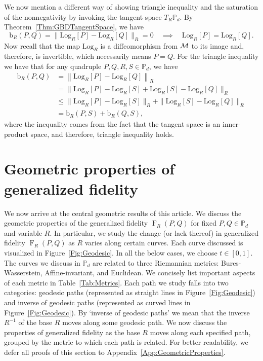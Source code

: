 \documentclass[12pt]{article}
\theoremstyle{definition}
\def \Log {\mathrm{Log}}
\begin{document}
We now mention a different way of showing triangle inequality and the saturation of the nonnegativity by invoking the tangent space $T_R \mathbb P_d$. By Theorem~\ref{Thm:GBDTangentSpace}, we have
\begin{equation}
    \text{b}_R(P,Q) = \| \Log_R[P] - \Log_R[Q]\|_R = 0 \quad \implies \quad  \Log_R[P] = \Log_R[Q].  
\end{equation}
Now recall that the map $\Log_R$ is a diffeomorphism from $\cal M$ to its image and, therefore, is invertible, which necessarily means $P = Q$. For the triangle inequality we have that for any quadruple $P,Q,R,S \in \mathbb P_d$, we have
\begin{equation}
\begin{aligned}
\text{b}_R(P,Q) &=  \left\|\Log_R[P] - \Log_R[Q]\right\|_R \\ & = \|\Log_R[P] - \Log_R[S] + \Log_R[S] - \Log_R[Q]\|_R \\ &\leq \|\Log_R[P] - \Log_R[S]\|_R + \|\Log_R[S] - \Log_R[Q]\|_R  \\ &= \text{b}_R(P,S) + \text{b}_R(Q,S),
\end{aligned}
\end{equation}
where the inequality comes from the fact that the tangent space is an inner-product space, and therefore, triangle inequality holds. 







\section{Geometric properties of generalized fidelity } \label{Sec:GeometricProperties}

We now arrive at the central geometric results of this article. We discuss the geometric properties of the generalized fidelity $\operatorname{F}_R(P,Q)$ for fixed $P, Q \in \mathbb P_d$ and variable $R$. In particular, we study the change (or lack thereof) in generalized fidelity $\operatorname{F}_R(P,Q)$ as $R$ varies along certain curves. Each curve discussed is visualized in Figure~\ref{Fig:Geodesic}. In all the below cases, we choose $t \in [0,1]$. The curves we discuss in $\mathbb P_d$ are related to three Riemannian metrics: Bures-Wasserstein, Affine-invariant, and Euclidean. We concisely list important aspects of each metric in Table~\ref{Tab:Metrics}. Each path we study falls into two categories: geodesic paths (represented as straight lines in Figure~\ref{Fig:Geodesic}) and inverse of geodesic paths (represented as curved lines in Figure~\ref{Fig:Geodesic}). By `inverse of geodesic paths' we mean that the inverse $R ^{-1} $ of the base $R$ moves along some geodesic path. We now discuss the properties of generalized fidelity as the base $R$ moves along each specified path, grouped by the metric to which each path is related. For better readability, we defer all proofs of this section to Appendix~\ref{App:GeometricProperties}.
\end{document}
